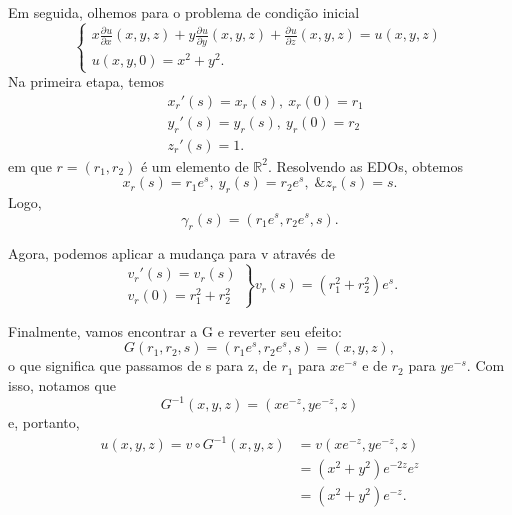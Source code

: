 \documentclass[../pde_notes.tex]{subfiles}
\begin{document}
\begin{example}
	Em seguida, olhemos para o problema de condição inicial
	\[
		\left\{\begin{array}{ll}
			x \frac{\partial^{}u}{\partial x^{}}(x, y, z) + y \frac{\partial^{}u}{\partial y^{}}(x, y, z) + \frac{\partial^{}u}{\partial z^{}}(x, y, z) = u(x, y, z) \\
			u(x, y, 0) = x^{2} + y^{2}.
		\end{array}\right.
	\]
	Na primeira etapa, temos
	\begin{align*}
		 & x_{r}'(s) = x_{r}(s),\: x_{r}(0) = r_{1} \\
		 & y_{r}'(s) = y_{r}(s),\: y_{r}(0) = r_{2} \\
		 & z_{r}'(s) = 1.
	\end{align*}
	em que \(r = (r_{1}, r_{2})\) é um elemento de \(\mathbb{R}^{2}\). Resolvendo as EDOs, obtemos
	\[
		x_{r}(s) = r_{1}e^{s},\: y_{r}(s) = r_{2}e^{s},\; \& z_{r}(s) = s.
	\]
	Logo,
	\[
		\gamma_{r}(s) = (r_{1}e^{s}, r_{2}e^{s}, s).
	\]

	Agora, podemos aplicar a mudança para v através de
	\[
		\left.\begin{array}{ll}
			v_{r}'(s) = v_{r}(s) \\
			v_{r}(0) = r_{1}^{2} + r_{2}^{2}
		\end{array}\right\} v_{r}(s) = (r_{1}^{2} + r_{2}^{2})e^{s}.
	\]

	Finalmente, vamos encontrar a G e reverter seu efeito:
	\[
		G(r_{1},r_{2}, s) = (r_{1}e^{s}, r_{2}e^{s}, s) = (x, y, z),
	\]
	o que significa que passamos de s para z, de \(r_1\) para \(xe^{-s}\) e de \(r_{2}\) para \(ye^{-s}\). Com isso, notamos que
	\[
		G^{-1}(x, y, z) = (xe^{-z}, ye^{-z}, z)
	\]
	e, portanto,
	\begin{align*}
		u(x, y, z) = v\circ G^{-1}(x, y, z) & = v(xe^{-z}, ye^{-z}, z)    \\
		                                    & = (x^{2}+y^{2})e^{-2z}e^{z} \\
		                                    & = (x^{2}+y^{2})e^{-z}.
	\end{align*}
\end{example}
\end{document}
